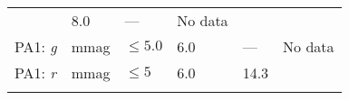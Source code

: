 \documentclass[DM,lsstdraft,toc]{lsstdoc}
\begin{document}
\begin{longtable}[]{@{}llllll@{}}
\begin{minipage}[t]{0.17\columnwidth}
\end{minipage} & \begin{minipage}[t]{0.17\columnwidth}\raggedright\strut
8.0\strut
\end{minipage} & \begin{minipage}[t]{0.12\columnwidth}\raggedright\strut
---\strut
\end{minipage} & \begin{minipage}[t]{0.17\columnwidth}\raggedright\strut
No data\strut
\end{minipage}\tabularnewline
\begin{minipage}[t]{0.14\columnwidth}\raggedright\strut
PA1: \emph{g}\strut
\end{minipage} & \begin{minipage}[t]{0.06\columnwidth}\raggedright\strut
mmag\strut
\end{minipage} & \begin{minipage}[t]{0.17\columnwidth}\raggedright\strut
\(\leq 5.0\)\strut
\end{minipage} & \begin{minipage}[t]{0.17\columnwidth}\raggedright\strut
6.0\strut
\end{minipage} & \begin{minipage}[t]{0.12\columnwidth}\raggedright\strut
---\strut
\end{minipage} & \begin{minipage}[t]{0.17\columnwidth}\raggedright\strut
No data\strut
\end{minipage}\tabularnewline
\begin{minipage}[t]{0.14\columnwidth}\raggedright\strut
PA1: \emph{r}\strut
\end{minipage} & \begin{minipage}[t]{0.06\columnwidth}\raggedright\strut
mmag\strut
\end{minipage} & \begin{minipage}[t]{0.17\columnwidth}\raggedright\strut
\(\leq 5\)\strut
\end{minipage} & \begin{minipage}[t]{0.17\columnwidth}\raggedright\strut
6.0\strut
\end{minipage} & \begin{minipage}[t]{0.12\columnwidth}\raggedright\strut
14.3\strut
\end{minipage} & \begin{minipage}[t]{0.17\columnwidth}\raggedright\strut
\strut
\end{minipage}\tabularnewline
\begin{minipage}[t]{0.14\columnwidth}\raggedright\strut

\end{minipage}
\end{longtable}
\end{document}
